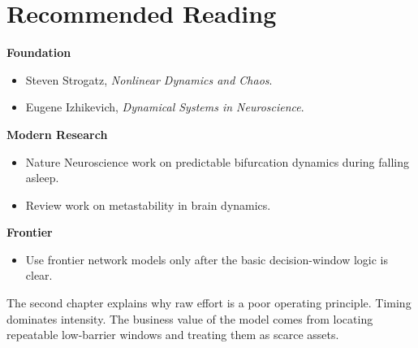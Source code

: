 \section{Recommended Reading}

\begin{readingbox}
\textbf{Foundation}
\begin{itemize}[nosep]
  \item Steven Strogatz, \emph{Nonlinear Dynamics and Chaos}.
  \item Eugene Izhikevich, \emph{Dynamical Systems in Neuroscience}.
\end{itemize}
\textbf{Modern Research}
\begin{itemize}[nosep]
  \item Nature Neuroscience work on predictable bifurcation dynamics during
        falling asleep.
  \item Review work on metastability in brain dynamics.
\end{itemize}
\textbf{Frontier}
\begin{itemize}[nosep]
  \item Use frontier network models only after the basic decision-window logic
        is clear.
\end{itemize}
\end{readingbox}

\begin{summarybox}
The second chapter explains why raw effort is a poor operating principle.
Timing dominates intensity. The business value of the model comes from locating
repeatable low-barrier windows and treating them as scarce assets.
\end{summarybox}
